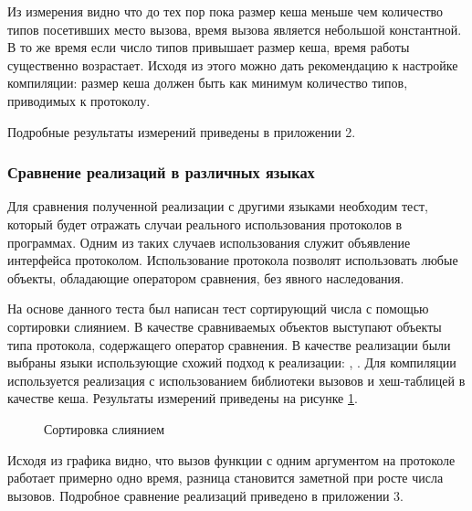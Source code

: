 Из измерения видно что до тех пор пока размер кеша меньше чем количество типов посетивших место вызова, время вызова является небольшой константной. В то же время если число типов привышает размер кеша, время работы существенно возрастает. Исходя из этого можно дать рекомендацию к настройке компиляции: размер кеша должен быть как минимум количество типов, приводимых к протоколу.

Подробные результаты измерений приведены в приложении 2.

\subsubsection{Сравнение реализаций в различных языках}
Для сравнения полученной реализации с другими языками необходим тест, который будет отражать случаи реального использования протоколов в программах. Одним из таких случаев использования служит объявление интерфейса  протоколом. Использование протокола  позволят использовать любые объекты, обладающие оператором сравнения, без явного наследования.

На основе данного теста был написан тест сортирующий числа с помощью сортировки слиянием\cite{9780262033848}. В качестве сравниваемых объектов выступают объекты типа протокола, содержащего оператор сравнения. В качестве реализации были выбраны  языки использующие схожий подход к реализации: , . Для компиляции  используется реализация с использованием библиотеки вызовов и хеш-таблицей в качестве кеша. Результаты измерений приведены на рисунке \ref{plot:bench:mergeSort}.

\begin{figure}[H]
\caption{\label{plot:bench:mergeSort} Сортировка слиянием}
\end{figure}

Исходя из графика видно, что вызов функции с одним аргументом на протоколе работает примерно одно время, разница становится заметной при росте числа вызовов. Подробное сравнение реализаций приведено в приложении 3.
